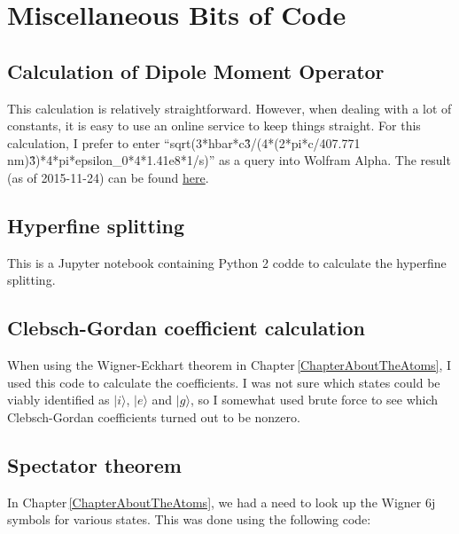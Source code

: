 \chapter{Miscellaneous Bits of Code}
\label{sympy6jAppendix}

\section{Calculation of Dipole Moment Operator}
This calculation is relatively straightforward. However, when dealing with a lot of constants, it is easy to use an online service to keep things straight. For this calculation, I prefer to enter ``sqrt(3*hbar*c\^3/(4*(2*pi*c/407.771 nm)\^3)*4*pi*epsilon\_0*4*1.41e8*1/s)'' as a query into Wolfram Alpha. The result (as of 2015-11-24) can be found 
\href{http://www.wolframalpha.com/input/?i=sqrt%283*hbar*c%5E3%2F%284*%282*pi*c%2F407.771+nm%29%5E3%29*4*pi*epsilon_0*4*1.41e8*1%2Fs%29}{here}.

\section{Hyperfine splitting}
This is a Jupyter notebook containing Python 2 codde to calculate the hyperfine splitting.

\section{Clebsch-Gordan coefficient calculation}
When using the Wigner-Eckhart theorem in Chapter\,\ref{ChapterAboutTheAtoms}, I used this code to calculate the coefficients. I was not sure which states could be viably identified as $|i\rangle$, $|e\rangle$ and $|g\rangle$, so I somewhat used brute force to see which Clebsch-Gordan coefficients turned out to be nonzero. 

\section{Spectator theorem}
In Chapter\,\ref{ChapterAboutTheAtoms}, we had a need to look up the Wigner 6j symbols for various states. This was done using the following code:

